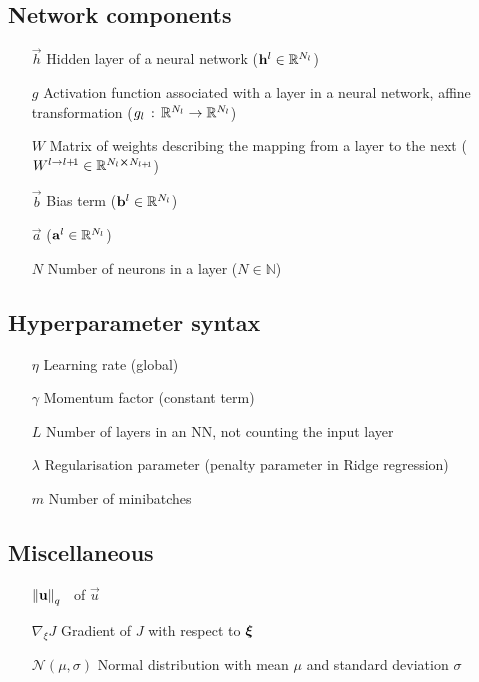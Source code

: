 \subsection*{Network components}
\begin{itemize}
    \item[$\vec{h}$] Hidden layer of a neural network ($\vec{h}^l \in \RR[N_l]$)
    \item[$g$] Activation function associated with a layer in a neural network, affine transformation ($g_l \,:\,\RR[N_l] \to\RR[N_{l}]$)
    \item[$W$] Matrix of weights describing the mapping from a layer to the next ($W^{l\to l+\! 1} \in \RR[N_l \cross N_{l+\! 1}]$)
    \item[$\vec{b}$] Bias term ($\vec{b}^l \in \RR[N_l]$)
    \item[$\vec{a}$]  ($\vec{a}^l \in \RR[N_l]$)
    \item[$N$] Number of neurons in a layer ($N \in \mathbb{N}$)
\end{itemize}

\subsection*{Hyperparameter syntax}
\begin{itemize}
    \item[$\eta$] Learning rate (global)
    \item[$\gamma$] Momentum factor (constant term)
    \item[$L$] Number of layers in an NN, not counting the input layer
    \item[$\lambda$] Regularisation parameter (penalty parameter in Ridge regression)
    \item[$m$] Number of minibatches
\end{itemize}


\subsection*{Miscellaneous}

\begin{enumerate}[leftmargin=4.1em]
    \item[$\norm{\vec{u}}_q$] \lnorm[q]\, of $\vec{u}$
    \item[$\nabla_{\!\xi} J$] Gradient of $J$ with respect to $\svec{\xi}$
    \item[$\mathcal{N}(\mu, \sigma)$]  Normal distribution with mean $\mu$ and standard deviation $\sigma$
\end{enumerate}

